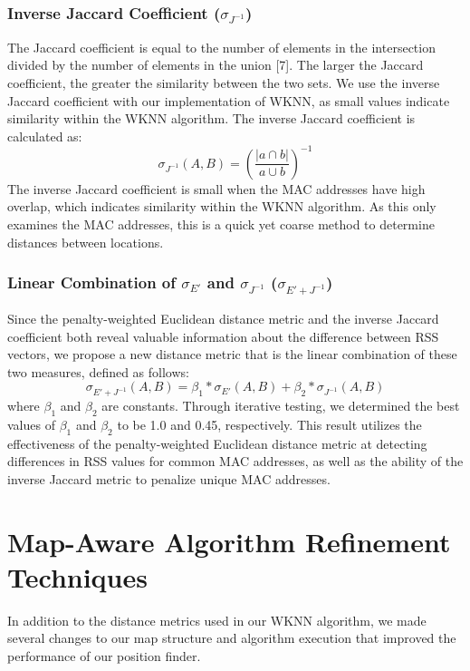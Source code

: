 \documentclass[conference]{IEEEtran}
\begin{document}
\subsubsection{Inverse Jaccard Coefficient ($\sigma_{J^{-1}}$)}
\indent The Jaccard coefficient is equal to the number of elements in the intersection divided by the number of elements in the union [7]. The larger the Jaccard coefficient, the greater the similarity between the two sets. We use the inverse Jaccard coefficient with our implementation of WKNN, as small values indicate similarity within the WKNN algorithm. The inverse Jaccard coefficient is calculated as:  
\begin{equation}
\label{jaccard}
\sigma_{J^{-1}}(A, B) = (\frac{|a\cap b|}{a\cup b})^{-1}
\end{equation}
The inverse Jaccard coefficient is small when the MAC addresses have high overlap, which indicates similarity within the WKNN algorithm. As this only examines the MAC addresses, this is a quick yet coarse method to determine distances between locations.

\subsubsection{Linear Combination of $\sigma_{E'}$ and $\sigma_{J^{-1}}$ ($\sigma_{E' + J^{-1}}$)}
\indent Since the penalty-weighted Euclidean distance metric and the inverse Jaccard coefficient both reveal valuable information about the difference between RSS vectors, we propose a new distance metric that is the linear combination of these two measures, defined as follows:
\begin{equation}
\label{combined}
\sigma_{E'+J^{-1}}(A, B) = \beta_1*\sigma_{E'}(A, B)+\beta_2*\sigma_{J^{-1}}(A, B)
\end{equation}
where $\beta_1$ and $\beta_2$ are constants. Through iterative testing, we determined the best values of $\beta_1$ and $\beta_2$ to be 1.0 and 0.45, respectively. This result utilizes the effectiveness of the penalty-weighted Euclidean distance metric at detecting differences in RSS values for common MAC addresses, as well as the ability of the inverse Jaccard metric to penalize unique MAC addresses.

\section{Map-Aware Algorithm Refinement Techniques}

In addition to the distance metrics used in our WKNN algorithm, we made several changes to our map structure and algorithm execution that improved the performance of our position finder. 
\end{document}
